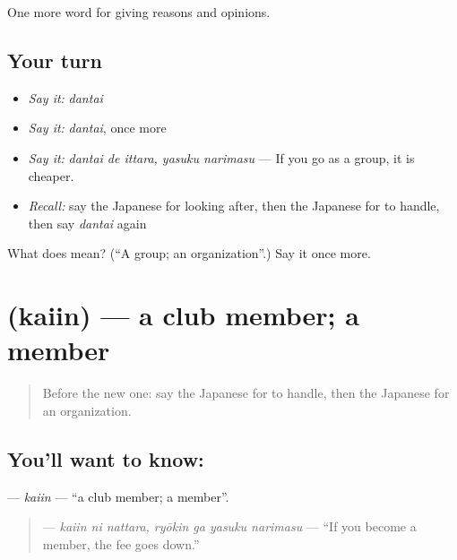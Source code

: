 \begin{grammarlens}[title={What you've built}]
One more word for giving reasons and opinions.
\end{grammarlens}

\subsection*{Your turn}
\begin{itemize}
\raggedright
  \item \emph{Say it:} \emph{dantai}
  \item \emph{Say it:} \emph{dantai}, once more
  \item \emph{Say it:} \emph{dantai de ittara, yasuku narimasu} — If you go as a group, it is cheaper.
  \item \emph{Recall:} say the Japanese for looking after, then the Japanese for to handle, then say \emph{dantai} again
\end{itemize}

\begin{tcolorbox}[breakable,colback=teal!4,colframe=teal!35!black,title={Before you move on}]
What does  mean? (\textquotedblleft{}A group; an organization\textquotedblright{}.) Say it once more.
\end{tcolorbox}
\section[\texorpdfstring{\ja{かいいん} (kaiin)}{かいいん (kaiin)}]{ (kaiin) — a club member; a member}

\label{lesson:JA-C335-kaiin}



\begin{quote}
Before the new one: say the Japanese for to handle, then the Japanese for an organization.
\end{quote}

\subsection*{You'll want to know: }
\textbf{} — \emph{kaiin} — \textquotedblleft{}a club member; a member\textquotedblright{}.

\begin{quote}
\textbf{   } — \emph{kaiin ni nattara, ryōkin ga yasuku narimasu} — \textquotedblleft{}If you become a member, the fee goes down.\textquotedblright{}
\end{quote}

